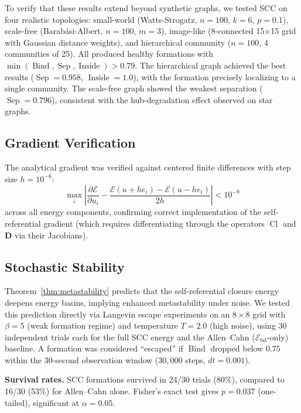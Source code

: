 \documentclass[lettersize,journal]{IEEEtran}
\DeclareMathOperator{\Cl}{Cl}
\DeclareMathOperator{\Bind}{Bind}
\DeclareMathOperator{\Sep}{Sep}
\DeclareMathOperator{\Inside}{Inside}
\begin{document}
To verify that these results extend beyond synthetic graphs, we tested SCC on four realistic topologies: small-world (Watts-Strogatz, $n=100$, $k=6$, $p=0.1$), scale-free (Barab\'{a}si-Albert, $n=100$, $m=3$), image-like (8-connected 15$\times$15 grid with Gaussian distance weights), and hierarchical community ($n=100$, 4 communities of 25). All produced healthy formations with $\min(\Bind, \Sep, \Inside) > 0.79$. The hierarchical graph achieved the best results ($\Sep = 0.958$, $\Inside = 1.0$), with the formation precisely localizing to a single community. The scale-free graph showed the weakest separation ($\Sep = 0.796$), consistent with the hub-degradation effect observed on star graphs.

\subsection{Gradient Verification}

The analytical gradient was verified against centered finite differences with step size $h = 10^{-6}$:
\begin{equation}
\max_i \left|\frac{\partial\mathcal{E}}{\partial u_i} - \frac{\mathcal{E}(u + h e_i) - \mathcal{E}(u - h e_i)}{2h}\right| < 10^{-9}
\end{equation}
across all energy components, confirming correct implementation of the self-referential gradient (which requires differentiating through the operators $\Cl$ and $\mathbf{D}$ via their Jacobians).

\subsection{Stochastic Stability}
\label{sec:stochastic}

Theorem~\ref{thm:metastability} predicts that the self-referential closure energy deepens energy basins, implying enhanced metastability under noise. We tested this prediction directly via Langevin escape experiments on an $8 \times 8$ grid with $\beta = 5$ (weak formation regime) and temperature $T = 2.0$ (high noise), using 30 independent trials each for the full SCC energy and the Allen--Cahn ($\mathcal{E}_{\mathrm{bd}}$-only) baseline. A formation was considered ``escaped'' if $\Bind$ dropped below $0.75$ within the 30-second observation window ($30{,}000$ steps, $dt = 0.001$).

\textbf{Survival rates.} SCC formations survived in 24/30 trials (80\%), compared to 16/30 (53\%) for Allen--Cahn alone. Fisher's exact test gives $p = 0.037$ (one-tailed), significant at $\alpha = 0.05$.
\end{document}
